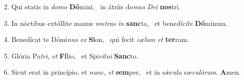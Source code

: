 2. Qui statis in \textit{do}\textit{mo} \textbf{Dó}mini, \ast\  in átriis do\textit{mus} \textit{De}\textit{i} \textbf{nos}tri.\

3. In nóctibus extóllite manus ves\textit{tras} \textit{in} \textbf{sanc}ta, \ast\  et bene\textit{dí}\textit{ci}\textit{te} \textbf{Dó}minum.\

4. Benedícat te Dómi\textit{nus} \textit{ex} \textbf{Si}on, \ast\  qui fecit \textit{cæ}\textit{lum} \textit{et} \textbf{ter}ram.\

5. Glória Pa\textit{tri}, \textit{et} \textbf{Fí}lio, \ast\  et Spi\textit{rí}\textit{tu}\textit{i} \textbf{Sanc}to.\

6. Sicut erat in princípio, et \textit{nunc}, \textit{et} \textbf{sem}per, \ast\  et in sǽcula sæ\textit{cu}\textit{ló}\textit{rum}. \textbf{A}men.\

